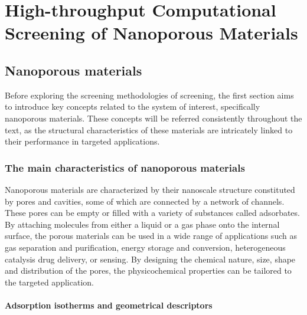 \documentclass[main.tex]{subfiles}
\begin{document}
\chapter{High-throughput Computational Screening of Nanoporous Materials}
\vspace*{-1\baselineskip}

\section{Nanoporous materials}

Before exploring the screening methodologies of screening, the first section aims to introduce key concepts related to the system of interest, specifically nanoporous materials. These concepts will be referred consistently throughout the text, as the structural characteristics of these materials
are intricately linked to their performance in targeted applications.

\subsection{The main characteristics of nanoporous materials}

Nanoporous materials are characterized by their nanoscale structure constituted by pores and cavities, some of which are connected by a network of channels. These pores can be empty or filled with a variety of substances called adsorbates. By attaching molecules from either a liquid or a gas phase onto the internal surface, the porous materials can be used in a wide range of applications such as gas separation and purification,\autocite{Li_2009,Lagorsse_2007} energy storage and conversion,\autocite{Morris_2008,Qiu_2020} heterogeneous catalysis\autocite{Bell_2003,Singh_2019,Pascanu_2019} drug delivery,\autocite{Della_Rocca_2011,Bernini_2014} or sensing.\autocite{Breslin_1976} By designing the chemical nature, size, shape and distribution of the pores, the physicochemical properties can be tailored to the targeted application.\autocite{Yan_2020}

\subsubsection{Adsorption isotherms and geometrical descriptors}
\end{document}
